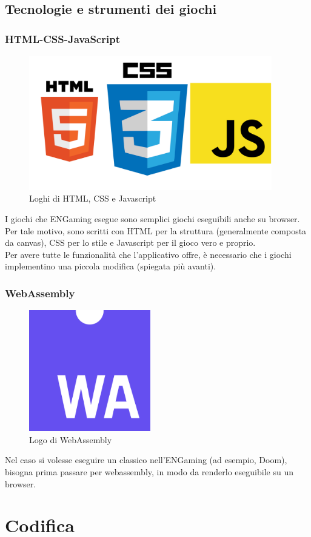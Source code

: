 \subsection{Tecnologie e strumenti dei giochi}

\subsubsection{HTML-CSS-JavaScript}
\begin{figure}[h]
    \centering
    \includegraphics[width=300pt]{images/technologies/HTMLCSSJS.png}
    \caption{Loghi di HTML, CSS e Javascript}
    \label{fig:HTMLCSSJS}
\end{figure}
I giochi che ENGaming esegue sono semplici giochi eseguibili anche su browser. Per tale motivo, sono scritti con HTML per la struttura (generalmente composta da canvas), CSS per lo stile e Javascript per il gioco vero e proprio.\\
Per avere tutte le funzionalità che l'applicativo offre, è necessario che i giochi implementino una piccola modifica (spiegata più avanti).

\subsubsection{WebAssembly}
\begin{figure}[h]
    \centering
    \includegraphics[width=150pt]{images/technologies/webassembly.png}
    \caption{Logo di WebAssembly}
    \label{fig:webassembly}
\end{figure}
Nel caso si volesse eseguire un classico nell'ENGaming (ad esempio, Doom), bisogna prima passare per \gls{webassembly}, in modo da renderlo eseguibile su un browser.


\section{Codifica}
